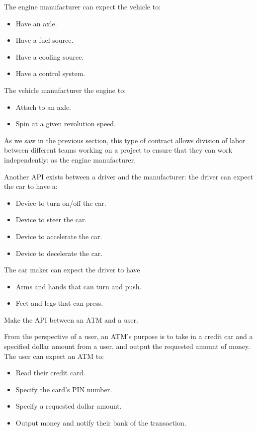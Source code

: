 The engine manufacturer can expect the vehicle to:
\begin{itemize}
	\item Have an axle.
	\item Have a fuel source.
	\item Have a cooling source.
	\item Have a control system.
\end{itemize}

The vehicle manufacturer the engine to:
\begin{itemize}
	\item Attach to an axle.
	\item Spin at a given revolution speed.
\end{itemize}

As we saw in the previous section, this type of contract allows division of labor between different teams working on a project to ensure that they can work independently: as the engine manufacturer, 

Another API exists between a driver and the manufacturer: the driver can expect the car to have a:
\begin{itemize}
	\item Device to turn on/off the car.
	\item Device to steer the car.
	\item Device to accelerate the car.
	\item Device to decelerate the car.
\end{itemize}

The car maker can expect the driver to have
\begin{itemize}
	\item Arms and hands that can turn and push.
	\item Feet and legs that can press.
\end{itemize}

\begin{example}
Make the API between an ATM and a user. 
\end{example}

From the perspective of a user, an ATM's purpose is to take in a credit car and a specified dollar amount from a user, and output the requested amount of money. The user can expect an ATM to:
\begin{itemize}
	\item Read their credit card.
	\item Specify the card's PIN number.
	\item Specify a requested dollar amount.
	\item Output money and notify their bank of the transaction.
\end{itemize}

